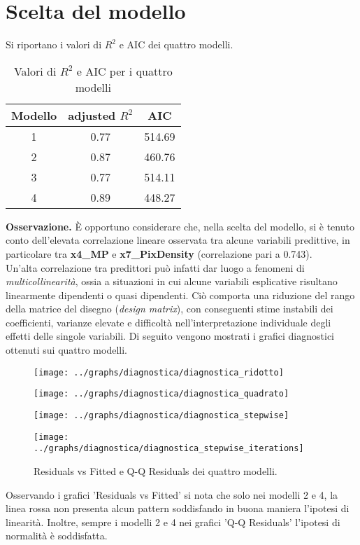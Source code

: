 \section{Scelta del modello}
Si riportano i valori di $R^2$ e AIC dei quattro modelli.
\begin{table}[H]
	\centering
	\begin{tabular}{|c|c|c|}
		\hline
		\textbf{Modello} & \textbf{adjusted} \boldmath$R^2$ & \textbf{AIC} \\
		\hline
		1 &  0.77  & 514.69 \\
		2 & 0.87 & 460.76 \\
		3 & 0.77 & 514.11 \\
		4 & 0.89 & 448.27 \\
		\hline
	\end{tabular}
	\caption{Valori di $R^2$ e AIC per i quattro modelli}
\end{table}
\textbf{Osservazione.} È opportuno considerare che, nella scelta del modello, si è tenuto conto dell’elevata correlazione lineare osservata tra alcune variabili predittive, in particolare tra \textbf{x4\_MP} e \textbf{x7\_PixDensity} (correlazione pari a 0.743). \\ 
   Un’alta correlazione tra predittori può infatti dar luogo a fenomeni di \emph{multicollinearità}, ossia a situazioni in cui alcune variabili esplicative risultano linearmente dipendenti o quasi dipendenti. Ciò comporta una riduzione del rango della matrice del disegno (\emph{design matrix}), con conseguenti stime instabili dei coefficienti, varianze elevate e difficoltà nell’interpretazione individuale degli effetti delle singole variabili.
Di seguito vengono mostrati i grafici diagnostici ottenuti sui quattro modelli.
\begin{figure}[H]
	\centering
	\texttt{[image: ../graphs/diagnostica/diagnostica\_ridotto]}
	\label{fig:diagnosticaridotto}
\end{figure}
\begin{figure}[H]
	\centering
	\texttt{[image: ../graphs/diagnostica/diagnostica\_quadrato]}
	\label{fig:diagnosticaridotto}
\end{figure}
\begin{figure}[H]
	\centering
	\texttt{[image: ../graphs/diagnostica/diagnostica\_stepwise]}
	\label{fig:diagnosticaridotto}
\end{figure}
\begin{figure}[H]
	\centering
	\texttt{[image: ../graphs/diagnostica/diagnostica\_stepwise\_iterations]}
	\label{fig:diagnosticaridotto}
	\caption{Residuals vs Fitted e Q-Q Residuals dei quattro modelli.}
\end{figure}
Osservando i grafici 'Residuals vs Fitted' si nota che solo nei modelli 2 e 4, la linea rossa non presenta alcun pattern soddisfando in buona maniera l'ipotesi di linearità. Inoltre, sempre i modelli 2 e 4 nei grafici 'Q-Q Residuals' l'ipotesi di normalità è soddisfatta. 


